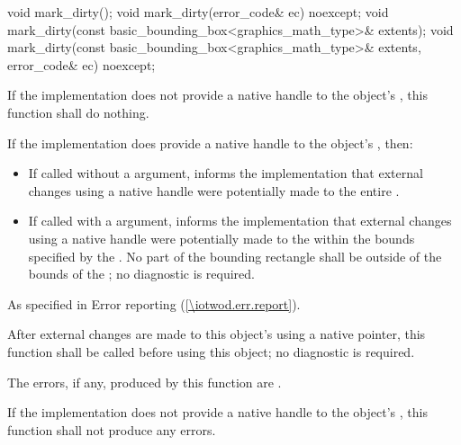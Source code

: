 %
\begin{itemdecl}
void mark_dirty();
void mark_dirty(error_code& ec) noexcept;
void mark_dirty(const basic_bounding_box<graphics_math_type>& extents);
void mark_dirty(const basic_bounding_box<graphics_math_type>& extents, error_code& ec) noexcept;
\end{itemdecl}
\begin{itemdescr}
\pnum
\effects
If the implementation does not provide a native handle to the  object's \underlyingsurface, this function shall do nothing.

\pnum
If the implementation does provide a native handle to the  object's \underlyingsurface, then:
\begin{itemize}
\item If called without a  argument, informs the implementation that external changes using a native handle were potentially made to the entire \underlyingsurface.
\item If called with a  argument, informs the implementation that external changes using a native handle were potentially made to the \underlyingsurface within the bounds specified by the  . No part of the bounding rectangle shall be outside of the bounds of the \underlyingsurface; no diagnostic is required.
\end{itemize}

\pnum
\throws
As specified in Error reporting (\ref{\iotwod.err.report}).

\pnum
\remarks
After external changes are made to this  object's \underlyingsurface using a native pointer, this function shall be called before using this  object; no diagnostic is required.

\pnum
\errors
The errors, if any, produced by this function are .

\pnum
If the implementation does not provide a native handle to the  object's \underlyingsurface, this function shall not produce any errors.
\end{itemdescr}

